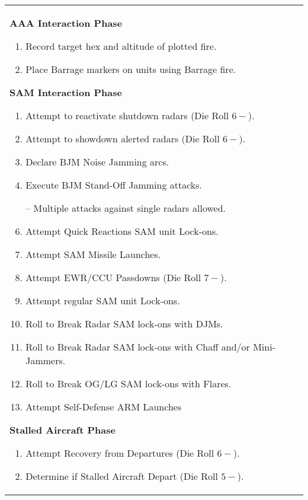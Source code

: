 \begin{twocolumntablefloat}
\begin{twocolumntable}
\footnotesize

\newcommand{\sopphase}[1]{\smallskip\textbf{#1}\par\smallskip}

\begin{tabularx}{1.0\linewidth}{L@{\hspace{\columnsep}}L}
\toprule

\sopphase{AAA Interaction Phase}

\begin{enumerate}[nosep]
    \item Record target hex and altitude of plotted fire.
    \item Place Barrage markers on units using Barrage fire.
\end{enumerate}

\sopphase{SAM Interaction Phase}

\begin{enumerate}[nosep]
    \item Attempt to reactivate shutdown radars (Die Roll $6-$).
    \item Attempt to showdown alerted radars (Die Roll $6-$).
    \item Declare BJM Noise Jamming arcs.
    \item Execute BJM Stand-Off Jamming attacks.
    \item[--] Multiple attacks against single radars allowed.
    \item Attempt Quick Reactions SAM unit Lock-ons.
    \item Attempt SAM Missile Launches.
    \item Attempt EWR/CCU Passdowns (Die Roll $7-$).
    \item Attempt regular SAM unit Lock-ons.
    \item Roll to Break Radar SAM lock-ons with DJMs.
    \item Roll to Break Radar SAM lock-ons with Chaff and/or Mini-Jammers.
    \item Roll to Break OG/LG SAM lock-ons with Flares.
    \item Attempt Self-Defense ARM Launches
\end{enumerate}

\sopphase{Stalled Aircraft Phase}

\begin{enumerate}[nosep]
    \item Attempt Recovery from Departures (Die Roll $6-$).
    \item Determine if Stalled Aircraft Depart (Die Roll $5-$).
\end{enumerate}


\end{tabularx}
\end{twocolumntable}
\end{twocolumntablefloat}
